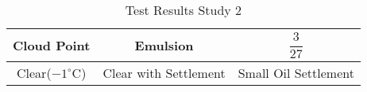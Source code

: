 \documentclass{article}
\newcommand\Tstrut{\rule{0pt}{3.6ex}}         %
\newcommand\Bstrut{\rule[-0.9ex]{0pt}{0pt}} \usepackage[margin=0.5in]{geometry}
\begin{document}
    \begin{longtable}[c]{| c |  c |  c |}
        \caption{Test Results Study 2 \label{long}}\\[.25in]
        \hline
        Cloud Point & Emulsion & $\dfrac{3}{27}$ \Tstrut\Bstrut \\[.1 in]
        \hline
        Clear($-1 ^{\circ}\mathrm{C}$) & Clear with Settlement & Small Oil Settlement \Tstrut\Bstrut \\[.1 in]
        \hline
    \end{longtable}
\end{document}
